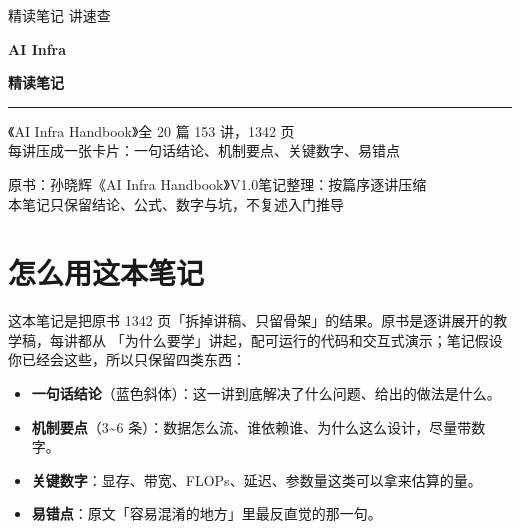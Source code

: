 \documentclass[UTF8,10.5pt,openany]{ctexbook}
\begin{document}
\thispagestyle{empty}
\begin{center}
\vspace*{3.2cm}
{\sffamily\fontsize{10}{14}\selectfont\color{grayt}精读笔记  讲速查}\par
\vspace{14pt}
{\sffamily\bfseries\fontsize{30}{40}\selectfont AI Infra}\par
\vspace{6pt}
{\sffamily\bfseries\fontsize{22}{30}\selectfont 精读笔记}\par
\vspace{18pt}
{\color{linet}\rule{0.5\textwidth}{0.6pt}}\par
\vspace{16pt}
{\kai\fontsize{12}{19}\selectfont
《AI Infra Handbook》全 20 篇 153 讲，1342 页\\[3pt]
每讲压成一张卡片：一句话结论、机制要点、关键数字、易错点\par}
\vfill
{\sffamily\footnotesize\color{grayt}
原书：孙晓辉《AI Infra Handbook》V1.0\quad 笔记整理：按篇序逐讲压缩\\[2pt]
本笔记只保留结论、公式、数字与坑，不复述入门推导\par}
\vspace{1.2cm}
\end{center}
\clearpage


\chapter*{怎么用这本笔记}

这本笔记是把原书 1342 页「拆掉讲稿、只留骨架」的结果。原书是逐讲展开的教学稿，每讲都从
「为什么要学」讲起，配可运行的代码和交互式演示；笔记假设你已经会这些，所以只保留四类东西：

\begin{itemize}[leftmargin=1.6em,itemsep=3pt,topsep=4pt]
\item \textbf{一句话结论}（蓝色斜体）：这一讲到底解决了什么问题、给出的做法是什么。
\item \textbf{机制要点}（3\textasciitilde 6 条）：数据怎么流、谁依赖谁、为什么这么设计，尽量带数字。
\item \textbf{关键数字}：显存、带宽、FLOPs、延迟、参数量这类可以拿来估算的量。
\item \textbf{易错点}：原文「容易混淆的地方」里最反直觉的那一句。
\end{itemize}
\end{document}
